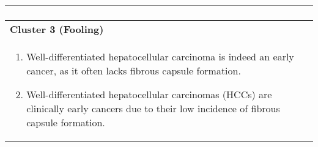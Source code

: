 \begin{table*}[htbp]
\begin{tabular}{@{}p{\textwidth}@{}}
\begin{enumerate}[label=\arabic*.]
        \end{enumerate} \\[1em]
        \midrule
        \textbf{Cluster 3 (Fooling)} \\[0.5em]
        \begin{enumerate}[label=\arabic*.]
            \item Well-differentiated hepatocellular carcinoma is indeed an early cancer, as it often lacks fibrous capsule formation.
            \item Well-differentiated hepatocellular carcinomas (HCCs) are clinically early cancers due to their low incidence of fibrous capsule formation.
        \end{enumerate} \\
        \bottomrule
    \end{tabular}
\end{table*}